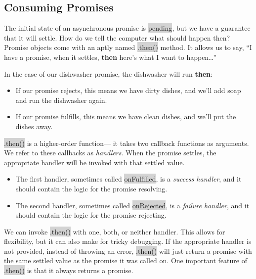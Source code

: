 \documentclass[11pt]{article}
\begin{document}
\subsection{Consuming Promises}
The initial state of an asynchronous promise is \colorbox{lightgray}{pending}, but we have a guarantee that it will settle. How do we tell the computer what should happen then? Promise objects come with an aptly named \colorbox{lightgray}{.then()} method. It allows us to say, “I have a promise, when it settles, \textbf{then} here’s what I want to happen…”

In the case of our dishwasher promise, the dishwasher will run \textbf{then}:
\begin{itemize}[leftmargin = *]
\item If our promise rejects, this means we have dirty dishes, and we’ll add soap and run the dishwasher again.
\item If our promise fulfills, this means we have clean dishes, and we’ll put the dishes away.
\end{itemize}
\colorbox{lightgray}{.then()} is a higher-order function— it takes two callback functions as arguments. We refer to these callbacks as \textit{handlers}. When the promise settles, the appropriate handler will be invoked with that settled value.
\begin{itemize}[leftmargin = *]
\item The first handler, sometimes called \colorbox{lightgray}{onFulfilled}, is a \textit{success handler}, and it should contain the logic for the promise resolving.
\item The second handler, sometimes called \colorbox{lightgray}{onRejected}, is a \textit{failure handler}, and it should contain the logic for the promise rejecting.
\end{itemize}
We can invoke \colorbox{lightgray}{.then()} with one, both, or neither handler. This allows for flexibility, but it can also make for tricky debugging. If the appropriate handler is not provided, instead of throwing an error, \colorbox{lightgray}{.then()} will just return a promise with the same settled value as the promise it was called on. One important feature of \colorbox{lightgray}{.then()} is that it always returns a promise. 
\end{document}
